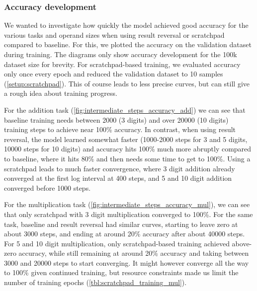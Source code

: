 \begin{table}[!htbp]
	\begin{minipage}[t]{0.47\linewidth}
		\hfill
		\label{tbl:scratchpad_sqrt_baseline}
	\end{minipage}
	\hfill %
	\begin{minipage}[t]{0.47\linewidth}
		\hfill
		\label{tbl:scratchpad_sqrt}
	\end{minipage}
\end{table}

\FloatBarrier
\subsubsection{Accuracy development}
\label{results:rev_scratch_accuracy}


We wanted to investigate how quickly the model achieved good accuracy for the various tasks and operand sizes when using result reversal or scratchpad compared to baseline. For this, we plotted the accuracy on the validation dataset during training.
The diagrams only show accuracy development for the 100k dataset size for brevity.
For scratchpad-based training, we evaluated accuracy only once every epoch and reduced the validation dataset to 10 samples (\cref{setup:scratchpad}). This of course leads to less precise curves, but can still give a rough idea about training progress.

For the addition task (\cref{fig:intermediate_steps_accuracy_add}) we can see that baseline training needs between 2000 (3 digits) and over 20000 (10 digits) training steps to achieve near 100\% accuracy. In contrast, when using result reversal, the model learned somewhat faster (1000-2000 steps for 3 and 5 digits, 10000 steps for 10 digits) and accuracy hits 100\% much more abruptly compared to baseline, where it hits 80\% and then needs some time to get to 100\%.
Using a scratchpad leads to much faster convergence, where 3 digit addition already converged at the first log interval at 400 steps, and 5 and 10 digit addition converged before 1000 steps.

For the multiplication task (\cref{fig:intermediate_steps_accuracy_mul}), we can see that only scratchpad with 3 digit multiplication converged to 100\%. For the same task, baseline and result reversal had similar curves, starting to leave zero at about 3000 steps, and ending at around 20\% accuracy after about 40000 steps.
For 5 and 10 digit multiplication, only scratchpad-based training achieved above-zero accuracy, while still remaining at around 20\% accuracy and taking between 3000 and 20000 steps to start converging.
It might however converge all the way to 100\% given continued training, but resource constraints made us limit the number of training epochs (\cref{tbl:scratchpad_training_mul}).

